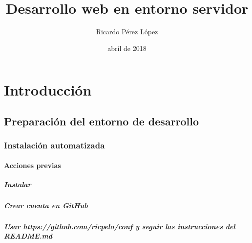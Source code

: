 \documentclass[a4paper,12pt,spanish]{sphinxmanual}
\title{Desarrollo web en entorno servidor}
\date{abril de 2018}
\author{Ricardo Pérez López}
\begin{document}
\maketitle
\sphinxtableofcontents
{}\label{\detokenize{index_latex::doc}}



\part{Introducción}
\label{\detokenize{introduccion:introduccion}}\label{\detokenize{introduccion:desarrollo-web-en-entorno-servidor}}\label{\detokenize{introduccion::doc}}

\chapter{Preparación del entorno de desarrollo}
\label{\detokenize{introduccion:preparacion-del-entorno-de-desarrollo}}

\section{Instalación automatizada}
\label{\detokenize{introduccion:instalacion-automatizada}}

\subsection{Acciones previas}
\label{\detokenize{introduccion:acciones-previas}}

\subsubsection{Instalar }
\label{\detokenize{introduccion:instalar-git}}

\subsubsection{Crear cuenta en GitHub}
\label{\detokenize{introduccion:crear-cuenta-en-github}}

\subsubsection{Usar https://github.com/ricpelo/conf y seguir las instrucciones del README.md}
\label{\detokenize{introduccion:usar-https-github-com-ricpelo-conf-y-seguir-las-instrucciones-del-readme-md}}
\end{document}
